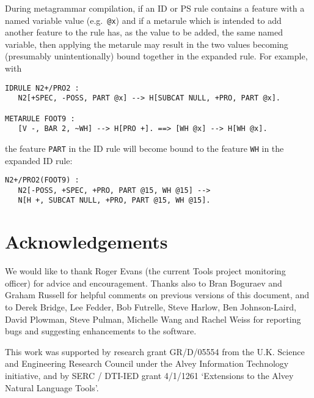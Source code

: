 During metagrammar compilation, if an ID or PS rule contains a feature
with a named variable value (e.g.\ {\tt @x}) and if a metarule
which is intended to add another feature to the rule has, as the value to
be added, the same named variable, then applying the metarule
may result in the two values becoming (presumably unintentionally) bound
together in the expanded rule. For example, with
\begin{ex}
\begin{verbatim}
IDRULE N2+/PRO2 :
   N2[+SPEC, -POSS, PART @x] --> H[SUBCAT NULL, +PRO, PART @x].

METARULE FOOT9 :
   [V -, BAR 2, ~WH] --> H[PRO +]. ==> [WH @x] --> H[WH @x].
\end{verbatim}
\end{ex}
the feature {\tt PART} in the ID rule will become bound to the feature
{\tt WH} in the expanded ID rule:
\begin{ex}
\begin{verbatim}
N2+/PRO2(FOOT9) :
   N2[-POSS, +SPEC, +PRO, PART @15, WH @15] -->
   N[H +, SUBCAT NULL, +PRO, PART @15, WH @15].
\end{verbatim}
\end{ex}


\chapter*{Acknowledgements}

We would like to thank Roger Evans (the current Tools project monitoring
officer) for advice and encouragement. Thanks also to Bran Boguraev and
Graham Russell for helpful comments on previous versions of this document,
and to Derek Bridge, Lee Fedder, Bob Futrelle,
Steve Harlow, Ben Johnson-Laird, David Plowman, Steve Pulman,
Michelle Wang and Rachel Weiss
for reporting bugs and suggesting enhancements to the software.

This work was supported by research grant GR/D/05554 from the U.K. Science
and Engineering Research Council under the Alvey Information Technology
initiative, and by SERC / DTI-IED grant 4/1/1261 `Extensions to the Alvey
Natural Language Tools'.


